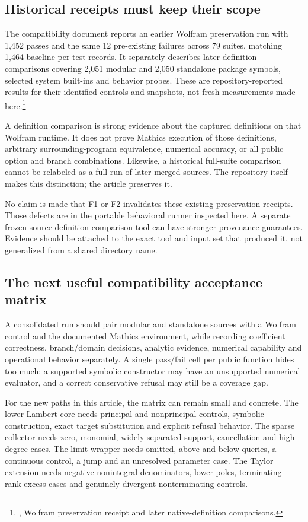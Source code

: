\documentclass[11pt,letterpaper]{article}
\newcommand{\src}[2]{\footnote{\cite{#1}, #2.}}
\begin{document}
\subsection{Historical receipts must keep their scope}

The compatibility document reports an earlier Wolfram preservation run with 1,452 passes and the same 12 pre-existing failures across 79 suites, matching 1,464 baseline per-test records. It separately describes later definition comparisons covering 2,051 modular and 2,050 standalone package symbols, selected system built-ins and behavior probes. These are repository-reported results for their identified controls and snapshots, not fresh measurements made here.\src{compat}{Wolfram preservation receipt and later native-definition comparisons}

A definition comparison is strong evidence about the captured definitions on that Wolfram runtime. It does not prove Mathics execution of those definitions, arbitrary surrounding-program equivalence, numerical accuracy, or all public option and branch combinations. Likewise, a historical full-suite comparison cannot be relabeled as a full run of later merged sources. The repository itself makes this distinction; the article preserves it.

No claim is made that F1 or F2 invalidates these existing preservation receipts. Those defects are in the portable behavioral runner inspected here. A separate frozen-source definition-comparison tool can have stronger provenance guarantees. Evidence should be attached to the exact tool and input set that produced it, not generalized from a shared directory name.

\subsection{The next useful compatibility acceptance matrix}

A consolidated run should pair modular and standalone sources with a Wolfram control and the documented Mathics environment, while recording coefficient correctness, branch/domain decisions, analytic evidence, numerical capability and operational behavior separately. A single pass/fail cell per public function hides too much: a supported symbolic constructor may have an unsupported numerical evaluator, and a correct conservative refusal may still be a coverage gap.

For the new paths in this article, the matrix can remain small and concrete. The lower-Lambert core needs principal and nonprincipal controls, symbolic construction, exact target substitution and explicit refusal behavior. The sparse collector needs zero, monomial, widely separated support, cancellation and high-degree cases. The limit wrapper needs omitted, above and below queries, a continuous control, a jump and an unresolved parameter case. The Taylor extension needs negative nonintegral denominators, lower poles, terminating rank-excess cases and genuinely divergent nonterminating controls.
\end{document}
